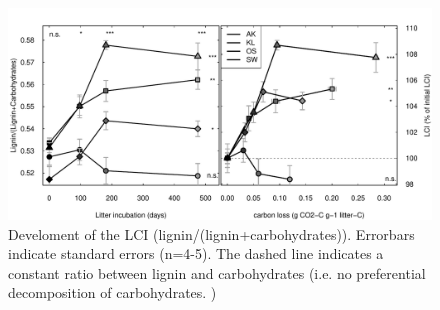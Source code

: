 \documentclass[10pt]{article}
\begin{document}
%
%
%
%
%
%
%
%

\newpage
\begin{figure}[h!]
\vspace*{2mm}
\begin{center}
\includegraphics{plosone-lci}
\end{center}
\caption{Develoment of the LCI (lignin/(lignin+carbohydrates)). Errorbars indicate standard errors (n=4-5). The dashed line indicates a constant ratio between lignin and carbohydrates (i.e. no preferential decomposition of carbohydrates. )}
\label{fig:lci}
\end{figure}
\end{document}
